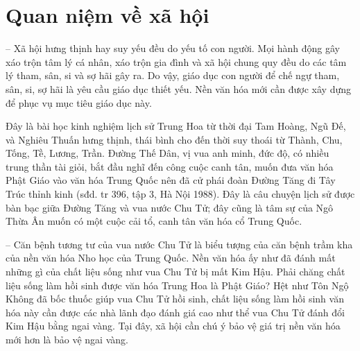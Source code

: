 \section{Quan niệm về xã hội} %
\label{sec:68_69_xa_hoi}

-- Xã hội hưng thịnh hay suy yếu đều do yếu tố con người. Mọi hành động gây xáo trộn tâm lý cá nhân, xáo trộn gia đình và xã hội chung quy đều do các tâm lý tham, sân, si và sợ hãi gây ra. Do vậy, giáo dục con người để chế ngự tham, sân, si, sợ hãi là yêu cầu giáo dục thiết yếu. Nền văn hóa mới cần được xây dựng để phục vụ mục tiêu giáo dục này.

Đây là bài học kinh nghiệm lịch sử Trung Hoa từ thời đại Tam Hoàng, Ngũ Đế, và Nghiêu Thuấn hưng thịnh, thái bình cho đến thời suy thoái từ Thành, Chu, Tống, Tề, Lương, Trần. Đường Thế Dân, vị vua anh minh, đức độ, có nhiều trung thần tài giỏi, bắt đầu nghĩ đến công cuộc canh tân, muốn đưa văn hóa Phật Giáo vào văn hóa Trung Quốc nên đã cử phái đoàn Đường Tăng đi Tây Trúc thỉnh kinh (sđd. tr 396, tập 3, Hà Nội 1988). Đây là câu chuyện lịch sử được bàn bạc giữa Đường Tăng và vua nước Chu Tử; đây cũng là tâm sự của Ngô Thừa Ân muốn có một cuộc cải tổ, canh tân văn hóa cổ Trung Quốc.

-- Căn bệnh tương tư của vua nước Chu Tử là biểu tượng của căn bệnh trầm kha của nền văn hóa Nho học của Trung Quốc. Nền văn hóa ấy như đã đánh mất những gì của chất liệu sống như vua Chu Tử bị mất Kim Hậu. Phải chăng chất liệu sống làm hồi sinh được văn hóa Trung Hoa là Phật Giáo? Hệt như Tôn Ngộ Không đã bốc thuốc giúp vua Chu Tử hồi sinh, chất liệu sống làm hồi sinh văn hóa này cần được các nhà lãnh đạo đánh giá cao như thể vua Chu Tử đánh đổi Kim Hậu bằng ngai vàng. Tại đây, xã hội cần chú ý bảo vệ giá trị nền văn hóa mới hơn là bảo vệ ngai vàng.
